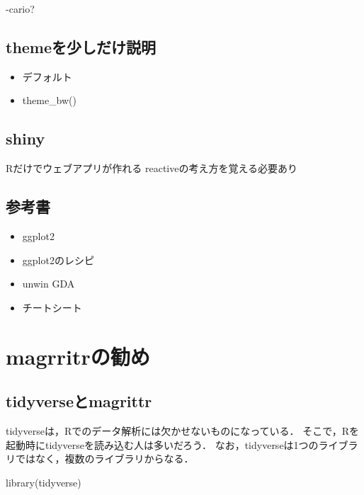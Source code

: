 \documentclass[
]{article}
\newenvironment{Shaded}{\begin{snugshade}}{\end{snugshade}}
\newcommand{\FunctionTok}[1]{\textcolor[rgb]{0.00,0.00,0.00}{#1}}
\newcommand{\NormalTok}[1]{#1}
\providecommand{\tightlist}{%
  \setlength{\itemsep}{0pt}\setlength{\parskip}{0pt}}
\begin{document}
-cario?

\hypertarget{themeux3092ux5c11ux3057ux3060ux3051ux8aacux660e}{%
\subsection{themeを少しだけ説明}\label{themeux3092ux5c11ux3057ux3060ux3051ux8aacux660e}}

\begin{itemize}
\tightlist
\item
  デフォルト\\
\item
  theme\_bw()
\end{itemize}

\hypertarget{shiny}{%
\subsection{shiny}\label{shiny}}

Rだけでウェブアプリが作れる
reactiveの考え方を覚える必要あり

\hypertarget{ux53c2ux8003ux66f8}{%
\subsection{参考書}\label{ux53c2ux8003ux66f8}}

\begin{itemize}
\tightlist
\item
  ggplot2
\item
  ggplot2のレシピ
\item
  unwin GDA
\item
  チートシート
\end{itemize}

\hypertarget{magrittr}{%
\section{magrritrの勧め}\label{magrittr}}

\hypertarget{tidyverseux3068magrittr}{%
\subsection{tidyverseとmagrittr}\label{tidyverseux3068magrittr}}

tidyverseは，Rでのデータ解析には欠かせないものになっている．
そこで，Rを起動時にtidyverseを読み込む人は多いだろう．
なお，tidyverseは1つのライブラリではなく，複数のライブラリからなる．

\begin{Shaded}
\begin{Highlighting}[]
\FunctionTok{library}\NormalTok{(tidyverse)}
\end{Highlighting}
\end{Shaded}
\end{document}
